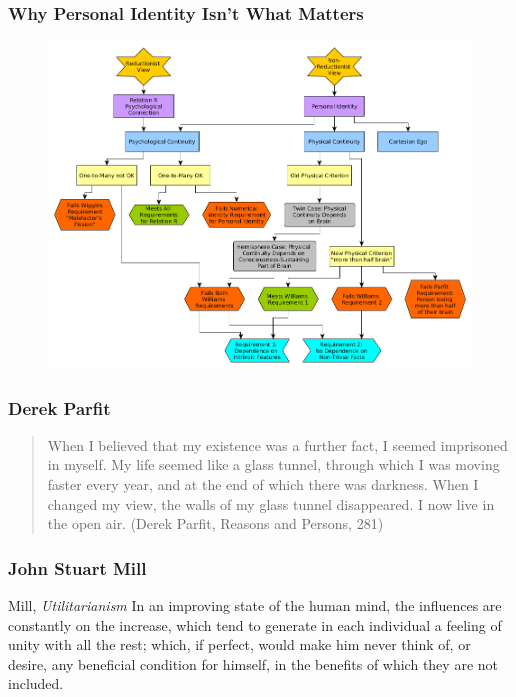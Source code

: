 \documentclass[xcolor=dvipsnames]{beamer}
\begin{document}
\begin{frame}
  \frametitle{Why Personal Identity Isn't What Matters}
  \begin{figure}[h]
    \includegraphics[scale=0.3]{./parfit.png}
  \end{figure}
\end{frame}

\begin{frame}
  \frametitle{Derek Parfit}
  \begin{quote}
    When I believed that my existence was a further fact, I seemed
    imprisoned in myself. My life seemed like a glass tunnel, through
    which I was moving faster every year, and at the end of which
    there was darkness. When I changed my view, the walls of my glass
    tunnel disappeared. I now live in the open air. (Derek Parfit,
    Reasons and Persons, 281)
  \end{quote}
\end{frame}

\begin{frame}
  \frametitle{John Stuart Mill}
  \begin{block}{Mill, \emph{Utilitarianism}}
    In an improving state of the human mind, the influences are
    constantly on the increase, which tend to generate in each
    individual a feeling of unity with all the rest; which, if
    perfect, would make him never think of, or desire, any beneficial
    condition for himself, in the benefits of which they are not
    included.
  \end{block}
\end{frame}
\end{document}
